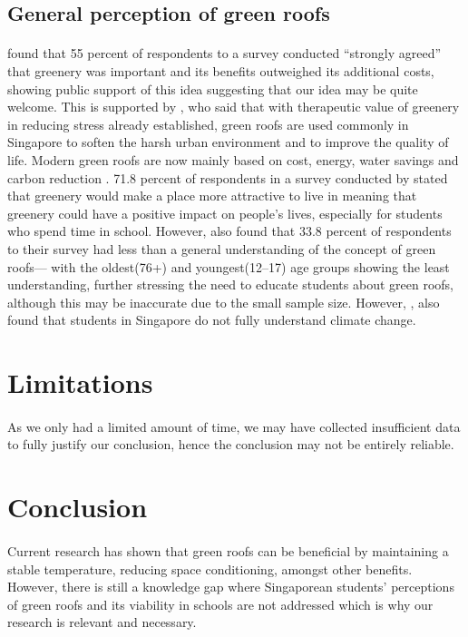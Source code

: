 \documentclass{article}
\begin{document}
\begin{multicols}{2}
  \subsection{General perception of green roofs}
  \paragraph{} \cite{CommAwareGBSyd} found that 55 percent of respondents
  to a survey conducted “strongly agreed” that greenery was important
  and its benefits outweighed its additional costs, showing public support
  of this idea suggesting that our idea may be quite welcome. This is
  supported by \cite{CFGRSG}, who said that with therapeutic value of
  greenery in reducing stress already established, green roofs are used
  commonly in Singapore to soften the harsh urban environment and to
  improve the quality of life. Modern green roofs are now mainly based on
  cost, energy, water savings and carbon reduction \cite{CFGRSG}.  71.8
  percent of respondents in a survey conducted by \cite{CommAwareGBSyd}
  stated that greenery would make a place more attractive to live in
  meaning that greenery could have a positive impact on people’s
  lives, especially for students who spend time in school. However,
  \cite{GRBuildEnSave} also found that 33.8 percent of respondents to
  their survey had less than a general understanding of the concept of
  green roofs--- with the oldest(76+) and youngest(12--17) age groups
  showing the least understanding, further stressing the need to educate
  students about green roofs, although this may be inaccurate due to
  the small sample size. However, \cite{student_carbon_footprint}, also
  found that students in Singapore do not fully understand climate change.



  \section{Limitations}
  \paragraph{} As we only had a limited amount of time, we may have collected
  insufficient data to fully justify our conclusion, hence the conclusion may
  not be entirely reliable.
  \section{Conclusion}
  \paragraph{} Current research has shown that green roofs can be
  beneficial by maintaining a stable temperature, reducing space
  conditioning, amongst other benefits. However, there is still
  a knowledge gap where Singaporean students' perceptions of green
  roofs and its viability in schools are not addressed which is why our
  research is relevant and necessary.

\end{multicols}
\end{document}
